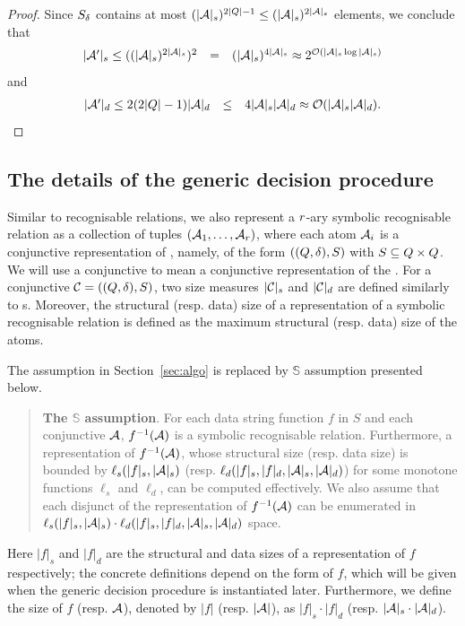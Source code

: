 \begin{proof}
Since $S_{\delta}$ contains at most $(|\mathcal{A}|_s)^{2 |Q|-1} \le (|\mathcal{A}|_s)^{2 |\mathcal{A}|_s}$ elements, we conclude that 
$$
\begin{array}{l c l}
|\mathcal{A}'|_s \le ((|\mathcal{A}|_s)^{2|\mathcal{A}|_s})^2  & = & (|\mathcal{A}|_s)^{4|\mathcal{A}|_s} 
 \approx    2^{\mathcal{O}\left(|\mathcal{A}|_s \log |\mathcal{A}|_s\right)}
\end{array}
$$ 
and 
$$
\begin{array}{l c l}
|\mathcal{A}'|_d \le 2(2|Q|-1) |\mathcal{A}|_d & \le & 4 |\mathcal{A}|_s |\mathcal{A}|_d 
\approx   \mathcal{O}( |\mathcal{A}|_s |\mathcal{A}|_d).
\end{array}
$$
\end{proof}




\subsection{The details of the generic decision procedure}


Similar to recognisable relations, we also represent a  $r$-ary symbolic recognisable relation as a collection of tuples $(\mathcal{A}_1, \ldots, \mathcal{A}_r)$, where each atom $\mathcal{A}_i$ is a conjunctive representation of \SA{}, namely, of the form $((Q, \delta), S)$ with $S \subseteq Q \times Q$. We will use a conjunctive \SA{} to mean a conjunctive representation of the \SA{}. For a conjunctive \SA{} $\mathcal{C}= ((Q, \delta), S)$, two size measures $|\mathcal{C}|_s$ and $|\mathcal{C}|_d$ are defined similarly to \SA{}s. Moreover, the structural (resp. data) size of a representation of a symbolic recognisable relation is defined as the maximum structural (resp. data) size of the atoms.


The \prerec{} assumption in Section~\ref{sec:algo} is replaced by $\mathbb{S}$\prerec{} assumption presented below.
\begin{quote}
{\bf The $\mathbb{S}$\prerec{} assumption}. For each data string function $f$ in $S$ and each conjunctive \SA{} $\mathcal{A}$,  $f^{-1}(\mathcal{A})$ is a symbolic recognisable relation. Furthermore, 
a representation of $f^{-1}(\mathcal{A})$, whose structural size (resp. data size) is bounded by  $\ell_s(|f|_s, |\mathcal{A}|_s)$ (resp. $\ell_d(|f|_s,  |f|_d, |\mathcal{A}|_s, |\mathcal{A}|_d)$) for some monotone functions $\ell_s$ and $\ell_d$, can be computed effectively. We also assume that each disjunct of the representation of $f^{-1}(\mathcal{A})$ can be enumerated in $\ell_s(|f|_s, |\mathcal{A}|_s) \cdot \ell_d(|f|_s,  |f|_d, |\mathcal{A}|_s,  |\mathcal{A}|_d)$ space.
%
\end{quote} 
%
Here $|f|_s$ and $|f|_d$ are the structural and data sizes of a representation of $f$ respectively; the concrete definitions depend on the form of $f$, which will be given when the generic decision procedure is instantiated later. Furthermore, we define the size of $f$ (resp. $\mathcal{A}$), denoted by $|f|$ (resp. $|\mathcal{A}|$), as $|f|_s \cdot |f|_d$ (resp. $|\mathcal{A}|_s \cdot |\mathcal{A}|_d$).

